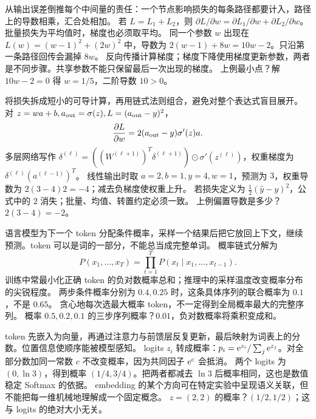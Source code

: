 \idea 从输出误差倒推每个中间量的责任：一个节点影响损失的每条路径都要计入，路径上的导数相乘，汇合处相加。
\mathpart 若 $L=L_1+L_2$，则 $\partial L/\partial w=\partial L_1/\partial w+\partial L_2/\partial w$。批量损失为平均值时，梯度也必须取平均。
\examplepart 同一个参数 $w$ 出现在 $L(w)=(w-1)^2+(2w)^2$ 中，导数为 $2(w-1)+8w=10w-2$。只沿第一条路径回传会漏掉 $8w$。
\pitfall 反向传播计算梯度；梯度下降使用梯度更新参数，两者是不同步骤。共享参数不能只保留最后一次出现的梯度。
\exercise 上例最小点？解 $10w-2=0$ 得 $w=1/5$，二阶导数 $10>0$。
\nextlesson

\idea 将损失拆成短小的可导计算，再用链式法则组合，避免对整个表达式盲目展开。
\mathpart 对 $z=wa+b,a_{\rm out}=\sigma(z),L=(a_{\rm out}-y)^2$，
\[\frac{\partial L}{\partial w}=2(a_{\rm out}-y)\sigma'(z)a.\]
多层网络写作 $\delta^{(\ell)}=((W^{(\ell+1)})^T\delta^{(\ell+1)})\odot\sigma'(z^{(\ell)})$，权重梯度为 $\delta^{(\ell)}(a^{(\ell-1)})^T$。
\examplepart 线性输出时取 $a=2,b=1,y=4,w=1$，预测为 $3$，权重导数为 $2(3-4)2=-4$；减去负梯度使权重上升。
\pitfall 若损失定义为 $\tfrac12(\hat y-y)^2$，公式中的 $2$ 消失；批量、均值、转置约定必须一致。
\exercise 上例偏置导数是多少？$2(3-4)=-2$。
\nextlesson

\idea 语言模型为下一个 token 分配条件概率，采样一个结果后把它放回上下文，继续预测。token 可以是词的一部分，不能总当成完整单词。
\mathpart 概率链式分解为
\[P(x_1,\ldots,x_T)=\prod_{t=1}^T P(x_t\mid x_1,\ldots,x_{t-1}).\]
训练中常最小化正确 token 的负对数概率总和；推理中的采样温度改变概率分布的尖锐程度。
\examplepart 两步条件概率分别为 $0.4,0.25$ 时，这条具体序列的联合概率为 $0.1$，不是 $0.65$。
\pitfall 贪心地每次选最大概率 token，不一定得到全局概率最大的完整序列。
\exercise 概率 $0.5,0.2,0.1$ 的三步序列概率？$0.01$，负对数概率将乘积变成和。
\nextlesson

\idea token 先嵌入为向量，再通过注意力与前馈层反复更新，最后映射为词表上的分数。位置信息使顺序能被模型感知。
\mathpart logits $z_i$ 转成概率：$p_i=\mathrm e^{z_i}/\sum_j\mathrm e^{z_j}$。对全部分数加同一常数 $c$ 不改变概率，因为共同因子 $\mathrm e^c$ 会抵消。
\examplepart 两个 logits 为 $(0,\ln3)$，得到概率 $(1/4,3/4)$。把两者都减去 $\ln3$ 后概率相同，这也是数值稳定 Softmax 的依据。
\pitfall embedding 的某个方向可在特定实验中呈现语义关联，但不能把每一维机械地理解成一个固定概念。
\exercise $z=(2,2)$ 的概率？$(1/2,1/2)$；这与 logits 的绝对大小无关。
\nextlesson


